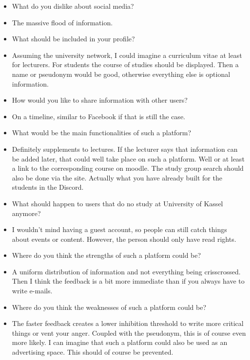 {\begin{itemize}[]
    \item {} What do you dislike about social media?
    \item {} The massive flood of information.
    \item {} What should be included in your profile?
    \item {} Assuming the university network, I could imagine a curriculum vitae at least for lecturers. For students the course of studies should be displayed. Then a name or pseudonym would be good, otherwise everything else is optional information.
    \item {} How would you like to share information with other users?
    \item {} On a timeline, similar to Facebook if that is still the case.
    \item {} What would be the main functionalities of such a platform?
    \item {} Definitely supplements to lectures. If the lecturer says that information can be added later, that could well take place on such a platform. Well or at least a link to the corresponding course on moodle. The study group search should also be done via the site. Actually what you have already built for the students in the Discord.
    \item {} What should happen to users that do no study at University of Kassel anymore?
    \item {} I wouldn't mind having a guest account, so people can still catch things about events or content. However, the person should only have read rights.
    \item {} Where do you think the strengths of such a platform could be?
    \item {} A uniform distribution of information and not everything being crisscrossed. Then I think the feedback is a bit more immediate than if you always have to write e-mails.
    \item {} Where do you think the weaknesses of such a platform could be?
    \item {} The faster feedback creates a lower inhibition threshold to write more critical things or vent your anger. Coupled with the pseudonym, this is of course even more likely. I can imagine that such a platform could also be used as an advertising space. This should of course be prevented.
\end{itemize}}
\nolinenumbers
